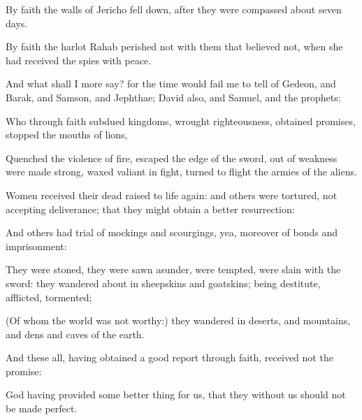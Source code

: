 {By
faith the
walls of
Jericho fell
down, after they were
compassed
about
seven
days.

By
faith the
harlot
Rahab
perished
not
with them that believed
not, when she had
received the
spies
with
peace.

And
what shall
I
more
say?
for the
time would
fail
me to
tell
of
Gedeon,
and
{}
Barak,
and
{}
Samson,
and
{}
Jephthae;
{}
David
also,
and
Samuel,
and
{} the
prophets:

Who
through
faith
subdued
kingdoms,
wrought
righteousness,
obtained
promises,
stopped the
mouths of
lions,

Quenched the
violence of
fire,
escaped the
edge of the
sword, out
of
weakness were made
strong,
waxed
valiant
in
fight, turned to
flight the
armies of the
aliens.

Women
received
their
dead raised to life
again:
and
others were
tortured,
not
accepting
deliverance;
that they might
obtain
a
better
resurrection:

And
others
had
trial
of
{}
mockings
and
scourgings,
yea,
moreover of
bonds
and
imprisonment:

They were
stoned, they were sawn
asunder, were
tempted, were
slain with the
sword: they wandered
about
in
sheepskins
and
goatskins; being
destitute,
afflicted,
tormented;

(Of
whom the
world
was
not
worthy:) they
wandered
in
deserts,
and
{}
mountains,
and
{}
dens
and
caves of the
earth.

And
these
all, having obtained a good
report
through
faith,
received
not the
promise:

God having
provided
some
better
thing
for
us,
that they
without
us
should
not be made
perfect.




\par }
